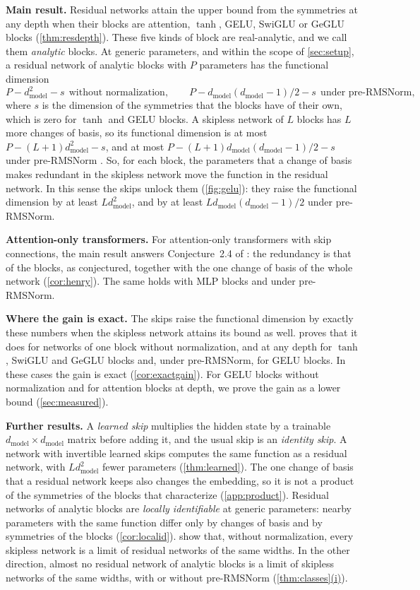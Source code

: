 \documentclass[10pt]{article}
\theoremstyle{definition}
\theoremstyle{remark}
\newcommand{\dm}{d_{\mathrm{model}}}
\newcommand{\para}[1]{\smallskip\noindent\textbf{#1}\hspace{0.5em}}
\DeclareRobustCommand{\cpref}[2]{\hyperref[#1:#2]{\cref*{#1}(#2)}}
\newcommand{\KDbound}{4.3}    %
\begin{document}
\para{Main result.} Residual networks attain the upper bound from the symmetries at any depth when their blocks are attention, $\tanh$, GELU, SwiGLU or GeGLU blocks (\cref{thm:resdepth}). These five kinds of block are real-analytic, and we call them \emph{analytic} blocks. At generic parameters, and within the scope of \cref{sec:setup}, a residual network of analytic blocks with $P$ parameters has the functional dimension
\[
P - \dm^2 - s \ \ \text{without normalization}, \qquad P - \dm(\dm-1)/2 - s \ \ \text{under pre-RMSNorm},
\]
where $s$ is the dimension of the symmetries that the blocks have of their own, which is zero for $\tanh$ and GELU blocks. A skipless network of $L$ blocks has $L$ more changes of basis, so its functional dimension is at most $P - (L+1)\dm^2 - s$, and at most $P - (L+1)\dm(\dm-1)/2 - s$ under pre-RMSNorm \citep[Theorem~\KDbound]{karbevski2026dimension}. So, for each block, the parameters that a change of basis makes redundant in the skipless network move the function in the residual network. In this sense the skips unlock them (\cref{fig:gelu}): they raise the functional dimension by at least $L\dm^2$, and by at least $L\dm(\dm-1)/2$ under pre-RMSNorm.

\para{Attention-only transformers.} For attention-only transformers with skip connections, the main result answers Conjecture~2.4 of \citet{henry2026generic}: the redundancy is that of the blocks, as conjectured, together with the one change of basis of the whole network (\cref{cor:henry}). The same holds with MLP blocks and under pre-RMSNorm.

\para{Where the gain is exact.} The skips raise the functional dimension by exactly these numbers when the skipless network attains its bound as well. \citet{karbevski2026dimension} proves that it does for networks of one block without normalization, and at any depth for $\tanh$, SwiGLU and GeGLU blocks and, under pre-RMSNorm, for GELU blocks. In these cases the gain is exact (\cref{cor:exactgain}). For GELU blocks without normalization and for attention blocks at depth, we prove the gain as a lower bound (\cref{sec:measured}).

\para{Further results.} A \emph{learned skip} multiplies the hidden state by a trainable $\dm\times\dm$ matrix before adding it, and the usual skip is an \emph{identity skip}. A network with invertible learned skips computes the same function as a residual network, with $L\dm^2$ fewer parameters (\cref{thm:learned}). The one change of basis that a residual network keeps also changes the embedding, so it is not a product of the symmetries of the blocks that \citet{wang2025gauge} characterize (\cref{app:product}). Residual networks of analytic blocks are \emph{locally identifiable} at generic parameters: nearby parameters with the same function differ only by changes of basis and by symmetries of the blocks (\cref{cor:localid}). \citet{mijoski2026worth} show that, without normalization, every skipless network is a limit of residual networks of the same widths. In the other direction, almost no residual network of analytic blocks is a limit of skipless networks of the same widths, with or without pre-RMSNorm (\cpref{thm:classes}{i}).
\end{document}

